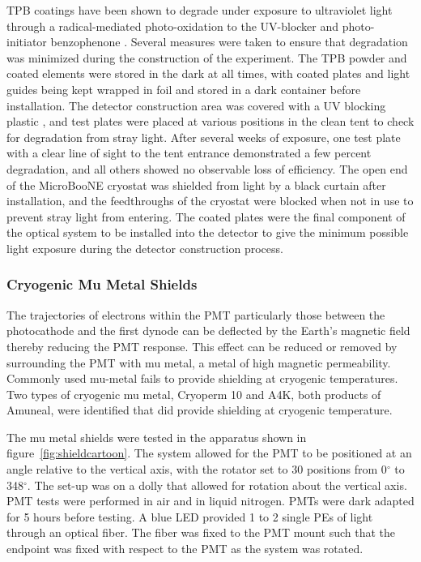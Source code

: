 TPB coatings have been shown to degrade under exposure to ultraviolet light \cite{Chiu:2012} through a radical-mediated photo-oxidation to the UV-blocker and photo-initiator benzophenone \cite{Jones:2013}.  Several measures were taken to ensure that degradation was minimized during the construction of the experiment.  The TPB powder and coated elements were stored in the dark at all times, with coated plates and light guides being kept wrapped in foil and stored in a dark container before installation.  The detector construction area was covered with a UV blocking plastic \cite{LexanThermoclear}, and test plates were placed at various positions in the clean tent to check for degradation from stray light.  After several weeks of exposure, one test plate with a clear line of sight to the tent entrance demonstrated a few percent degradation, and all others showed no observable loss of efficiency. The open end of the MicroBooNE cryostat was shielded from light by a black curtain after installation, and the feedthroughs of the cryostat were blocked when not in use to prevent stray light from entering.  The coated plates were the final component of the optical system to be installed into the detector to give the minimum possible light exposure during the detector construction process.

\subsubsection{Cryogenic Mu Metal Shields}







The trajectories of electrons within the PMT particularly those between the photocathode and the first dynode can be deflected by the Earth's magnetic field thereby reducing the PMT response.  This effect can be reduced or removed by surrounding the PMT with mu metal, a metal of high magnetic permeability.  Commonly used mu-metal fails to provide shielding at cryogenic temperatures. Two types of cryogenic mu metal, Cryoperm 10 and A4K, both products of Amuneal, were identified that did provide shielding at cryogenic temperature. 

The mu metal shields were tested in the apparatus shown in figure~\ref{fig:shieldcartoon}.  The system allowed for the PMT to be positioned at an angle relative to the vertical axis, with the rotator set to 30 positions from 0$^{\circ}$ to 348$^\circ$.    The set-up was on a dolly that allowed for rotation about the vertical axis.  PMT tests were performed in air and in liquid nitrogen.   PMTs were dark adapted for 5 hours before testing.  %
A blue LED provided 1 to 2 single PEs of light through an optical fiber.   The fiber was fixed to the PMT mount such that the endpoint was fixed with respect to the PMT as the system was rotated.   

